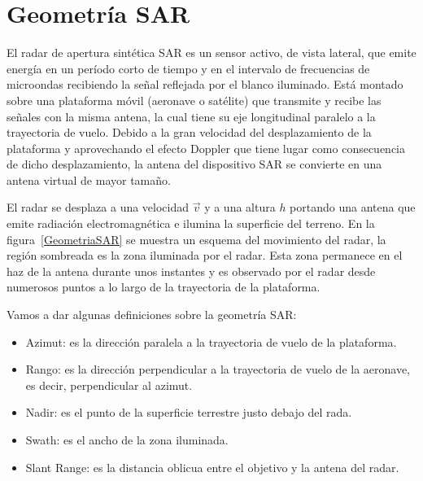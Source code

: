 \section{Geometría SAR}

El radar de apertura sintética SAR  es un sensor activo, de vista lateral, que emite energía en un período corto de tiempo y en el  intervalo  de  frecuencias  de  microondas recibiendo la señal reflejada por el blanco iluminado. Está montado sobre una plataforma móvil (aeronave o satélite) que transmite y recibe las señales con la misma antena, la cual tiene su eje longitudinal paralelo a la trayectoria de vuelo. Debido a la gran velocidad del desplazamiento de la plataforma y aprovechando el efecto Doppler que tiene lugar como consecuencia de dicho desplazamiento, la antena del dispositivo SAR  se convierte en una antena virtual de mayor tamaño. 

El radar se desplaza a una velocidad $\vec{v}$ y a una altura $h$ portando una antena que emite radiación electromagnética e ilumina la superficie del terreno. En la figura~\ref{GeometriaSAR} se muestra un esquema del movimiento del radar, la región sombreada es la zona iluminada por el radar. Esta zona permanece en el haz de la antena durante unos instantes y es observado por el radar desde numerosos puntos a lo largo de la trayectoria de la plataforma.

Vamos a dar algunas definiciones sobre la geometría SAR:
\begin{itemize}
	\item Azimut: es la dirección paralela a la trayectoria de vuelo de la plataforma.
	\item Rango: es la dirección perpendicular a la trayectoria de vuelo de la aeronave, es decir, perpendicular al azimut.
	\item Nadir: es el punto de la superficie terrestre justo debajo del rada.
	\item Swath: es el ancho de la zona iluminada.
	\item Slant Range: es la distancia oblicua entre el objetivo y la antena del radar.
\end{itemize}

